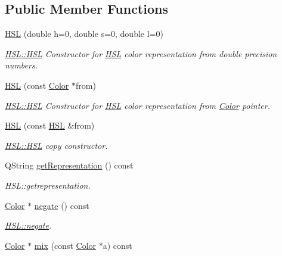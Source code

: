 \subsection*{Public Member Functions}
\begin{DoxyCompactItemize}
\item 
\hyperlink{class_h_s_l_af90e79ad88ecb7944c313330d4bde182}{H\+SL} (double h=0, double s=0, double l=0)
\begin{DoxyCompactList}\small\item\em \hyperlink{class_h_s_l_af90e79ad88ecb7944c313330d4bde182}{H\+S\+L\+::\+H\+SL} Constructor for \hyperlink{class_h_s_l}{H\+SL} color representation from double precision numbers. \end{DoxyCompactList}\item 
\hyperlink{class_h_s_l_ae737a28ec6a67bba89090c9a63c5cc21}{H\+SL} (const \hyperlink{class_color}{Color} $\ast$from)
\begin{DoxyCompactList}\small\item\em \hyperlink{class_h_s_l_af90e79ad88ecb7944c313330d4bde182}{H\+S\+L\+::\+H\+SL} Constructor for \hyperlink{class_h_s_l}{H\+SL} color representation from \hyperlink{class_color}{Color} pointer. \end{DoxyCompactList}\item 
\hyperlink{class_h_s_l_a165c0123fc7294e7ccdc53fc11c57154}{H\+SL} (const \hyperlink{class_h_s_l}{H\+SL} \&from)
\begin{DoxyCompactList}\small\item\em \hyperlink{class_h_s_l_af90e79ad88ecb7944c313330d4bde182}{H\+S\+L\+::\+H\+SL} copy constructor. \end{DoxyCompactList}\item 
Q\+String \hyperlink{class_h_s_l_a774dc0a5dad87bc9ff44956af4873602}{get\+Representation} () const
\begin{DoxyCompactList}\small\item\em H\+S\+L\+::getrepresentation. \end{DoxyCompactList}\item 
\hyperlink{class_color}{Color} $\ast$ \hyperlink{class_h_s_l_af681f885d11220b0588e8f969aa95e32}{negate} () const
\begin{DoxyCompactList}\small\item\em \hyperlink{class_h_s_l_af681f885d11220b0588e8f969aa95e32}{H\+S\+L\+::negate}. \end{DoxyCompactList}\item 
\hyperlink{class_color}{Color} $\ast$ \hyperlink{class_h_s_l_a08bcec2ca6961b7c6431d92a625c30a7}{mix} (const \hyperlink{class_color}{Color} $\ast$a) const

\end{DoxyCompactItemize}
